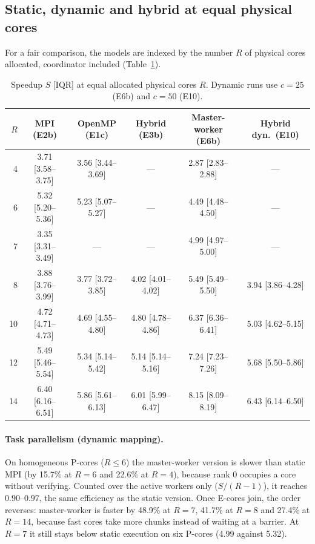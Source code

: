 \documentclass[10pt,a4paper]{article}
\begin{document}
\subsection{Static, dynamic and hybrid at equal physical cores}\label{sec:equal}

For a fair comparison, the models are indexed by the number $R$ of physical cores allocated, coordinator included (Table~\ref{tab:equal}).

\begin{table}[t]
\centering\small
\setlength{\tabcolsep}{4pt}
\begin{tabular}{rccccc}
\toprule
$R$ & \textbf{MPI (E2b)} & \textbf{OpenMP (E1c)} & \textbf{Hybrid (E3b)} & \textbf{Master-worker (E6b)} & \textbf{Hybrid dyn.\ (E10)} \\
\midrule
4  & 3.71 [3.58--3.75] & 3.56 [3.44--3.69] & --- & 2.87 [2.83--2.88] & --- \\
6  & 5.32 [5.20--5.36] & 5.23 [5.07--5.27] & --- & 4.49 [4.48--4.50] & --- \\
7  & 3.35 [3.31--3.49] & --- & --- & 4.99 [4.97--5.00] & --- \\
8  & 3.88 [3.76--3.99] & 3.77 [3.72--3.85] & 4.02 [4.01--4.02] & 5.49 [5.49--5.50] & 3.94 [3.86--4.28] \\
10 & 4.72 [4.71--4.73] & 4.69 [4.55--4.80] & 4.80 [4.78--4.86] & 6.37 [6.36--6.41] & 5.03 [4.62--5.15] \\
12 & 5.49 [5.46--5.54] & 5.34 [5.14--5.42] & 5.14 [5.14--5.16] & 7.24 [7.23--7.26] & 5.68 [5.50--5.86] \\
14 & 6.40 [6.16--6.51] & 5.86 [5.61--6.13] & 6.01 [5.99--6.47] & 8.15 [8.09--8.19] & 6.43 [6.14--6.50] \\
\bottomrule
\end{tabular}
\caption{Speedup $S$ [IQR] at equal allocated physical cores $R$. Dynamic runs use $c=25$ (E6b) and $c=50$ (E10).}
\label{tab:equal}
\end{table}

\paragraph{Task parallelism (dynamic mapping).} On homogeneous P-cores ($R\le6$) the master-worker version is slower than static MPI (by 15.7\% at $R=6$ and 22.6\% at $R=4$), because rank 0 occupies a core without verifying. Counted over the active workers only ($S/(R-1)$), it reaches $0.90$--$0.97$, the same efficiency as the static version. Once E-cores join, the order reverses: master-worker is faster by 48.9\% at $R=7$, 41.7\% at $R=8$ and 27.4\% at $R=14$, because fast cores take more chunks instead of waiting at a barrier. At $R=7$ it still stays below static execution on six P-cores (4.99 against 5.32).
\end{document}

